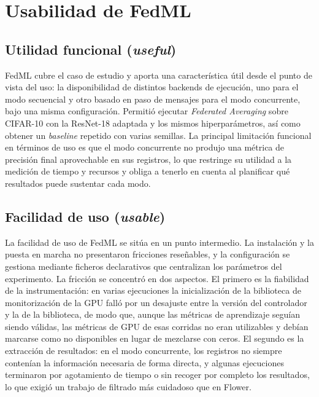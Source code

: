 \section{Usabilidad de FedML}\label{sec:usab-fedml}

\subsection{Utilidad funcional (\textit{useful})}\label{sec:usab-fedml-useful}

FedML cubre el caso de estudio y aporta una característica útil desde el punto de vista del
uso: la disponibilidad de distintos backends de ejecución, uno para el modo secuencial y otro
basado en paso de mensajes para el modo concurrente, bajo una misma configuración. Permitió
ejecutar \textit{Federated Averaging} sobre CIFAR-10 con la ResNet-18 adaptada y los mismos
hiperparámetros, así como obtener un \textit{baseline} repetido con varias semillas. La
principal limitación funcional en términos de uso es que el modo concurrente no produjo una
métrica de precisión final aprovechable en sus registros, lo que restringe su utilidad a la
medición de tiempo y recursos y obliga a tenerlo en cuenta al planificar qué resultados puede
sustentar cada modo.

\subsection{Facilidad de uso (\textit{usable})}\label{sec:usab-fedml-usable}

La facilidad de uso de FedML se sitúa en un punto intermedio. La instalación y la puesta en
marcha no presentaron fricciones reseñables, y la configuración se gestiona mediante ficheros
declarativos que centralizan los parámetros del experimento. La fricción se concentró en dos
aspectos. El primero es la fiabilidad de la instrumentación: en varias ejecuciones la
inicialización de la biblioteca de monitorización de la GPU falló por un desajuste entre la
versión del controlador y la de la biblioteca, de modo que, aunque las métricas de
aprendizaje seguían siendo válidas, las métricas de GPU de esas corridas no eran utilizables
y debían marcarse como no disponibles en lugar de mezclarse con ceros. El segundo es la
extracción de resultados: en el modo concurrente, los registros no siempre contenían la
información necesaria de forma directa, y algunas ejecuciones terminaron por agotamiento de
tiempo o sin recoger por completo los resultados, lo que exigió un trabajo de filtrado más
cuidadoso que en Flower.

